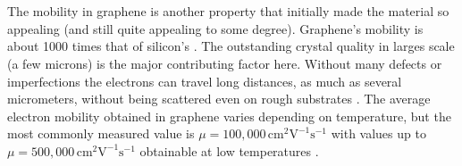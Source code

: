 \documentclass[%
 reprint,
 amsmath,amssymb,
 aps,
pra,
floatfix,
]{revtex4-1}
\begin{document}
\\ \\
The mobility in graphene is another property that initially made the material so appealing (and still quite appealing to some degree). Graphene's mobility is about 1000 times that of silicon's \cite{Dargys1994, 2DflexibleNanoElectronics2014}. The outstanding crystal quality in larges scale (a few microns) is the major contributing factor here. Without many defects or imperfections the electrons can travel long distances, as much as several micrometers, without being scattered even on rough substrates \cite{nanoscaleReview2011, Du2008}. The average electron mobility obtained in graphene varies depending on temperature, but the most commonly measured value is $\mu = 100,000\mathrm{\,cm}^2\mathrm{V}^{-1}\mathrm{s}^{-1}$ with values up to $\mu = 500,000\mathrm{\,cm}^2\mathrm{V}^{-1}\mathrm{s}^{-1}$ obtainable at low temperatures \cite{vanderWaalsHeterostruct2013}.
\end{document}
